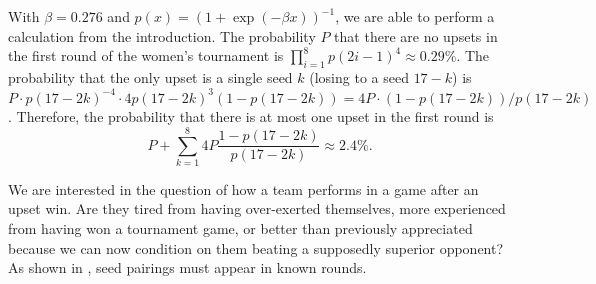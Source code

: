 \documentclass{article}
\begin{document}
With $\beta=0.276$ and $p(x)=(1+\exp(-\beta x))^{-1}$, we are able to perform a calculation from the introduction.  The probability $P$ that there are no upsets in the first round of the women's tournament is $\prod_{i=1}^8 p(2i-1)^4\approx0.29\%$. The probability that the only upset is a single seed $k$ (losing to a seed $17-k$) is $P\cdot p(17-2k)^{-4}\cdot4p(17-2k)^3(1-p(17-2k))=4P\cdot(1-p(17-2k))/p(17-2k)$.  Therefore, the probability that there is at most one upset in the first round is
\[P+\sum_{k=1}^8 4P\frac{1-p(17-2k)}{p(17-2k)}\approx2.4\%.\]

We are interested in the question of how a team performs in a game after an upset win.  Are they tired from having over-exerted themselves, more experienced from having won a tournament game, or better than previously appreciated because we can now condition on them beating a supposedly superior opponent?  As %
shown in \cite{Seltzer}, seed pairings must appear in known rounds.
\end{document}
